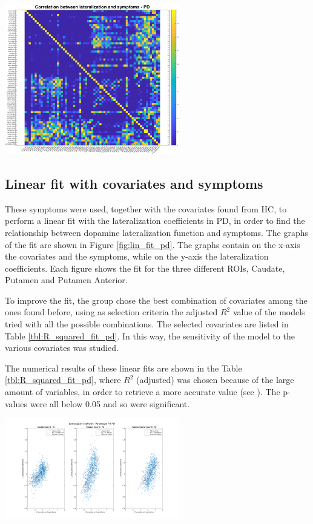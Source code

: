 \documentclass[]{article}
\newenvironment{Figure}
{\par\medskip\noindent\minipage{\linewidth}}
{\endminipage\par\medskip}
\begin{document}
\begin{multicols}{2}
\begin{Figure}
	\centering
	\includegraphics[width=3in]{../corr_mat_symptoms_pd}
	\label{fig:corr_symp_pd}
\end{Figure} 


\subsection{Linear fit with covariates and symptoms}

These symptoms were used, together with the covariates found from HC, to perform a linear fit with the lateralization coefficients in PD, in order to find the relationship between dopamine lateralization function and symptoms. The graphs of the fit are shown in Figure \ref{fig:lin_fit_pd}. The graphs contain on the x-axis the covariates and the symptoms, while on the y-axis the lateralization coefficients. Each figure shows the fit for the three different ROIs, Caudate, Putamen and Putamen Anterior. 

To improve the fit, the group chose the best combination of covariates among the ones found before, using as selection criteria the adjusted $R^2$ value of the models tried with all the possible combinations. The selected covariates are listed in Table \ref{tbl:R_squared_fit_pd}. 
In this way, the sensitivity of the model to the various covariates was studied.

The numerical results of these linear fits are shown in the Table \ref{tbl:R_squared_fit_pd}, where $R^2$ (adjusted) was chosen because of the large amount of variables, in order to retrieve a more accurate value (see \cite{analysis_of_covariance_and_alternatives}). The p-values were all below 0.05 and so were significant.

\begin{Figure}
	\centering
	\includegraphics[width=3in]{../fit_covariates_pd}
	\label{fig:lin_fit_pd}
\end{Figure} 



\end{multicols}
\end{document}
